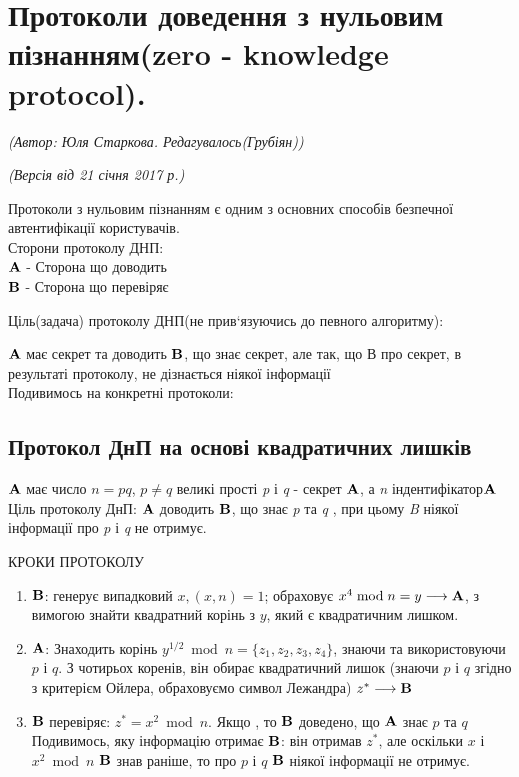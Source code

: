 %

\section{Протоколи доведення з нульовим пізнанням(zero - knowledge protocol).}
\begin{flushright}
\emph{(Автор: Юля Старкова. Редагувалось(Грубіян))}
\par \emph{(Версія від 21 січня 2017 р.)}
\end{flushright}

Протоколи з нульовим пізнанням є одним з основних способів безпечної автентифікації користувачів.\\
Сторони протоколу ДНП:\\
$\bold{A}$ - Сторона що доводить\\
$\bold{B}$ - Сторона що перевіряє

Ціль(задача) протоколу ДНП(не прив`язуючись до певного алгоритму):

$\bold{A}$ має секрет та доводить $\bold{B}$, що знає секрет, але так, що В про секрет, в результаті протоколу, не дізнається ніякої інформації\\
Подивимось на конкретні протоколи:\\

\subsection{Протокол ДнП на основі квадратичних лишків}

$\bold{A}$ має число $n = pq$,  $p\neq q$ великі прості \textsl{p} і \textsl{q} - секрет $\bold{A}$, а \textsl{n} \glqq індентифікатор\grqq $\bold{A}$\\
Ціль протоколу ДнП: $\bold{A}$ доводить $\bold{B}$, що знає \textsl{p} та \textsl{q} , при цьому \textsl{B} ніякої інформації про \textsl{p} і \textsl{q} не отримує.

\begin{center} 
КРОКИ ПРОТОКОЛУ
\end{center}

\begin{enumerate}
\item $\bold{B}$: генерує випадковий $x, (x,n) = 1$; 
обраховує $  x^4\bmod{n} = y \longrightarrow \bold{A}$, з вимогою знайти квадратний корінь з $y$, який є квадратичним лишком.
\item $\bold{A}$: Знаходить корінь $y^{1/2}\bmod n=\{z_1, z_2, z_3, z_4\} $, знаючи та використовуючи $p$ і $q$. З  чотирьох коренів, він обирає квадратичний лишок (знаючи $p$ і $q$ згідно з критерієм Ойлера, обраховуємо символ Лежандра) $z^* \longrightarrow \bold{B}$
\item $\bold{B}$  перевіряє: $z^* = x^2\bmod n$. Якщо \grqq, то $\bold{B}$ доведено, що $\bold{A}$ знає $p$ та $q$\\
Подивимось, яку інформацію отримає $\bold{B}$: він отримав $z^*$, але оскільки $x$ і $x^2\bmod n$ $\bold{B}$ знав раніше, то про $p$ і $q$ $\bold{B}$ ніякої інформації не отримує.
\end{enumerate}

